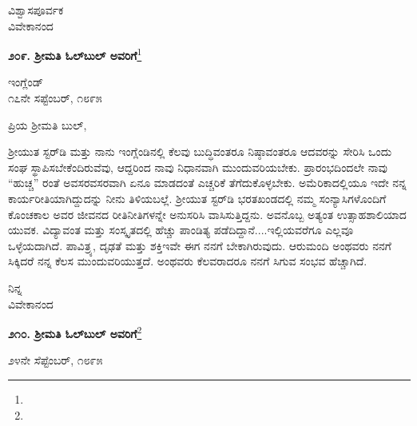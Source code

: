 \vspace{-0.3cm}

{\flushright
ವಿಶ್ವಾಸಪೂರ್ವಕ\\ವಿವೇಕಾನಂದ\par}

\vspace{-0.3cm}

\begin{center}
\textbf{೨೦೯. ಶ‍್ರೀಮತಿ ಓಲ್‌ಬುಲ್‌ ಅವರಿಗೆ}\footnote{}
\end{center}

\vspace{-0.4cm}

\begin{flushright}
ಇಂಗ್ಲೆಂಡ್\\೧೭ನೇ ಸಪ್ಟೆಂಬರ್, ೧೮೯೫
\end{flushright}

\vspace{-0.3cm}

\noindent
ಪ್ರಿಯ ಶ‍್ರೀಮತಿ ಬುಲ್,

ಶ‍್ರೀಯುತ ಸ್ಟರ್‌ಡಿ ಮತ್ತು ನಾನು ಇಂಗ್ಲೆಂಡಿನಲ್ಲಿ ಕೆಲವು ಬುದ್ಧಿವಂತರೂ ನಿಷ್ಠಾವಂತರೂ ಆದವರನ್ನು ಸೇರಿಸಿ ಒಂದು ಸಂಘ ಸ್ಥಾಪಿಸಬೇಕೆಂದಿರುವೆವು, ಆದ್ದರಿಂದ ನಾವು ನಿಧಾನವಾಗಿ ಮುಂದುವರಿಯಬೇಕು. ಪ್ರಾರಂಭದಿಂದಲೇ ನಾವು “ಹುಚ್ಚ” ರಂತೆ ಅವಸರವಸರವಾಗಿ ಏನೂ ಮಾಡದಂತೆ ಎಚ್ಚರಿಕೆ ತೆಗೆದುಕೊಳ್ಳಬೇಕು. ಅಮೆರಿಕಾದಲ್ಲಿಯೂ ಇದೇ ನನ್ನ ಕಾರ್ಯರೀತಿಯಾಗಿದ್ದುದನ್ನು ನೀನು ತಿಳಿಯಬಲ್ಲೆ. ಶ‍್ರೀಯುತ ಸ್ಟರ್‌ಡಿ ಭರತಖಂಡದಲ್ಲಿ ನಮ್ಮ ಸಂನ್ಯಾಸಿಗಳೊಂದಿಗೆ ಕೊಂಚಕಾಲ ಅವರ ಜೀವನದ ರೀತಿನೀತಿಗಳನ್ನೇ ಅನುಸರಿಸಿ ವಾಸಿಸುತ್ತಿದ್ದನು. ಅವನೊಬ್ಬ ಅತ್ಯಂತ ಉತ್ಸಾಹಶಾಲಿಯಾದ ಯುವಕ. ವಿದ್ಯಾವಂತ ಮತ್ತು ಸಂಸ್ಕೃತದಲ್ಲಿ ಹೆಚ್ಚು ಪಾಂಡಿತ್ಯ ಪಡೆದಿದ್ದಾನೆ....ಇಲ್ಲಿಯವರೆಗೂ ಎಲ್ಲವೂ ಒಳ್ಳೆಯದಾಗಿದೆ. ಪಾವಿತ್ರ್ಯ, ದೃಢತೆ ಮತ್ತು ಶಕ್ತಿ\enginline{-}ಇವೇ ಈಗ ನನಗೆ ಬೇಕಾಗಿರುವುದು. ಆರು\newpage\noindent ಮಂದಿ ಅಂಥವರು ನನಗೆ ಸಿಕ್ಕಿದರೆ ನನ್ನ ಕೆಲಸ ಮುಂದುವರಿಯುತ್ತದೆ. ಅಂಥವರು ಕೆಲವರಾದರೂ ನನಗೆ ಸಿಗುವ ಸಂಭವ ಹೆಚ್ಚಾಗಿದೆ.

\vspace{-0.4cm}

{\flushright
ನಿನ್ನ\\ವಿವೇಕಾನಂದ\par}
\vspace{-0.4cm}

\begin{center}
\textbf{೨೧೦. ಶ‍್ರೀಮತಿ ಓಲ್‌ಬುಲ್‌ ಅವರಿಗೆ}\footnote{}
\end{center}

\vspace{-0.7cm}

\begin{flushright}
೨೪ನೇ ಸೆಪ್ಟೆಂಬರ್, ೧೮೯೫
\end{flushright}
\vspace{-0.4cm}

